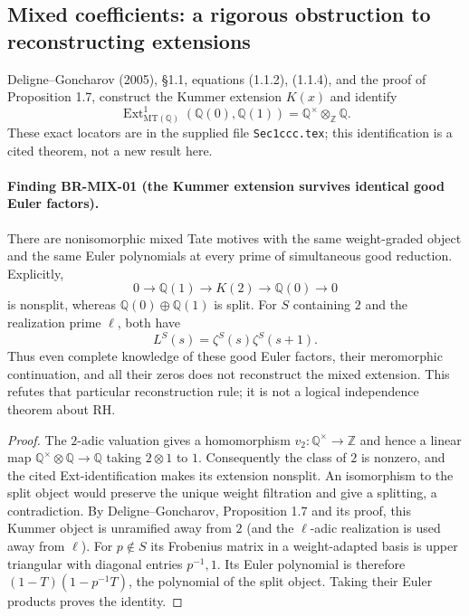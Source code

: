 \subsection{Mixed coefficients: a rigorous obstruction to reconstructing extensions}

Deligne--Goncharov (2005), \S1.1, equations (1.1.2), (1.1.4), and the
proof of Proposition 1.7, construct the Kummer extension $K(x)$ and
identify
\[
 \operatorname{Ext}^1_{\mathrm{MT}(\mathbb Q)}
   (\mathbb Q(0),\mathbb Q(1))=\mathbb Q^\times\otimes_{\mathbb Z}\mathbb Q.
\]
These exact locators are in the supplied file \texttt{Sec1ccc.tex}; this
identification is a cited theorem, not a new result here.

\paragraph{Finding BR-MIX-01 (the Kummer extension survives identical
good Euler factors).}
There are nonisomorphic mixed Tate motives with the same weight-graded
object and the same Euler polynomials at every prime of simultaneous
good reduction.  Explicitly,
\[
 0\longrightarrow\mathbb Q(1)\longrightarrow K(2)
 \longrightarrow\mathbb Q(0)\longrightarrow0
\]
is nonsplit, whereas $\mathbb Q(0)\oplus\mathbb Q(1)$ is split.  For
$S$ containing $2$ and the realization prime $\ell$, both have
\[
 L^S(s)=\zeta^S(s)\zeta^S(s+1).
\]
Thus even complete knowledge of these good Euler factors, their
meromorphic continuation, and all their zeros does not reconstruct
the mixed extension.  This refutes that particular reconstruction
rule; it is not a logical independence theorem about RH.

\begin{proof}
The $2$-adic valuation gives a homomorphism
$v_2:\mathbb Q^\times\to\mathbb Z$ and hence a linear map
$\mathbb Q^\times\otimes\mathbb Q\to\mathbb Q$ taking $2\otimes1$
to $1$.  Consequently the class of $2$ is nonzero, and the cited
Ext-identification makes its extension nonsplit.  An isomorphism to
the split object would preserve the unique weight filtration and
give a splitting, a contradiction.  By Deligne--Goncharov,
Proposition 1.7 and its proof, this Kummer object is unramified away
from $2$ (and the $\ell$-adic realization is used away from $\ell$).
For $p\notin S$ its Frobenius matrix in a weight-adapted basis is
upper triangular with diagonal entries $p^{-1},1$.  Its Euler
polynomial is therefore $(1-T)(1-p^{-1}T)$, the polynomial of the
split object.  Taking their Euler products proves the identity.
\end{proof}

